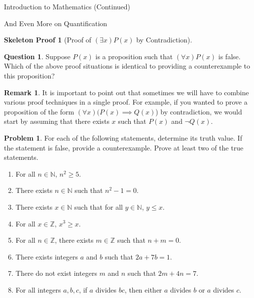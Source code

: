 \documentclass[11pt]{article}
\theoremstyle{definition}
\newtheorem{problem}[theorem]{Problem}
\newtheorem{remark}[theorem]{Remark}
\newtheorem{question}[theorem]{Question}
\newtheorem{skeleton}[theorem]{Skeleton Proof}
\begin{document}
\begin{section}{Introduction to Mathematics (Continued)}
\begin{subsection}{And Even More on Quantification}
\begin{skeleton}[Proof of $(\exists x)P(x)$ by Contradiction]
\end{skeleton}

\begin{question}
Suppose $P(x)$ is a proposition such that $(\forall x)P(x)$ is false.  Which of the above proof situations is identical to providing a counterexample to this proposition?
\end{question}

\begin{remark}
It is important to point out that sometimes we will have to combine various proof techniques in a single proof.  For example, if you wanted to prove a proposition of the form $(\forall x)(P(x) \implies Q(x)$) by contradiction, we would start by assuming that there exists $x$ such that $P(x)$ and $\neg Q(x)$.
\end{remark}

\begin{problem}
For each of the following statements, determine its truth value.  If the statement is false, provide a counterexample.  Prove at least two of the true statements.
\begin{enumerate}
\item For all $n\in\mathbb{N}$, $n^2\geq 5$.

\item There exists $n \in \mathbb{N}$ such that $n^2-1=0$.


\item There exists $x \in \mathbb{N}$ such that for all $y \in \mathbb{N}$, $y \leq x$.

\item For all $x\in\mathbb{Z}$, $x^3\geq x$.

\item For all $n\in\mathbb{Z}$, there exists $m\in\mathbb{Z}$ such that $n+m=0$.

\item There exists integers $a$ and $b$ such that $2a+7b=1$.

\item There do not exist integers $m$ and $n$ such that $2m+4n=7$.

\item For all integers $a, b, c$, if $a$ divides $bc$, then either $a$ divides $b$ or $a$ divides $c$.



\end{enumerate}
\end{problem}
\end{subsection}
\end{section}
\end{document}
